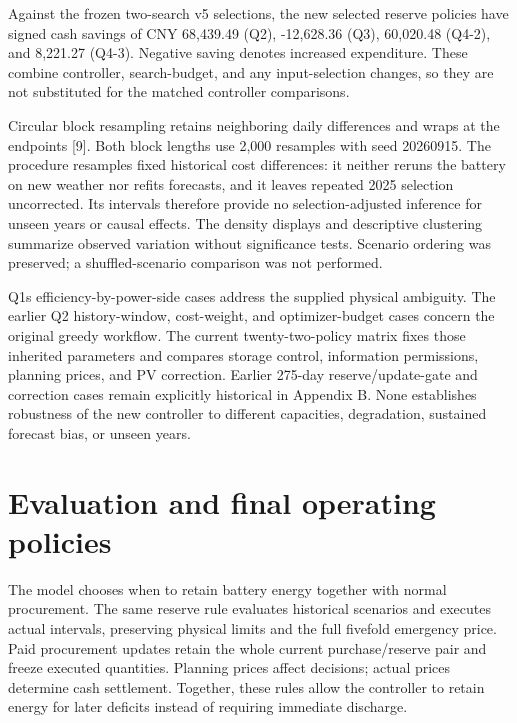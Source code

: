\endgroup

\begingroup
{}

Against the frozen two-search v5 selections, the new selected reserve policies have signed cash savings of CNY 68,439.49 (Q2), -12,628.36 (Q3), 60,020.48 (Q4-2), and 8,221.27 (Q4-3). Negative saving denotes increased expenditure. These combine controller, search-budget, and any input-selection changes, so they are not substituted for the matched controller comparisons.

\par
\endgroup

\begingroup
{}

Circular block resampling retains neighboring daily differences and wraps at the endpoints {[}9{]}. Both block lengths use 2,000 resamples with seed 20260915. The procedure resamples fixed historical cost differences: it neither reruns the battery on new weather nor refits forecasts, and it leaves repeated 2025 selection uncorrected. Its intervals therefore provide no selection-adjusted inference for unseen years or causal effects. The density displays and descriptive clustering summarize observed variation without significance tests. Scenario ordering was preserved; a shuffled-scenario comparison was not performed.

\par
\endgroup

Q1\textquotesingle s efficiency-by-power-side cases address the supplied physical ambiguity. The earlier Q2 history-window, cost-weight, and optimizer-budget cases concern the original greedy workflow. The current twenty-two-policy matrix fixes those inherited parameters and compares storage control, information permissions, planning prices, and PV correction. Earlier 275-day reserve/update-gate and correction cases remain explicitly historical in Appendix B. None establishes robustness of the new controller to different capacities, degradation, sustained forecast bias, or unseen years.

\section{Evaluation and final operating policies}\label{evaluation-and-final-operating-policies}

The model chooses when to retain battery energy together with normal procurement. The same reserve rule evaluates historical scenarios and executes actual intervals, preserving physical limits and the full fivefold emergency price. Paid procurement updates retain the whole current purchase/reserve pair and freeze executed quantities. Planning prices affect decisions; actual prices determine cash settlement. Together, these rules allow the controller to retain energy for later deficits instead of requiring immediate discharge.


